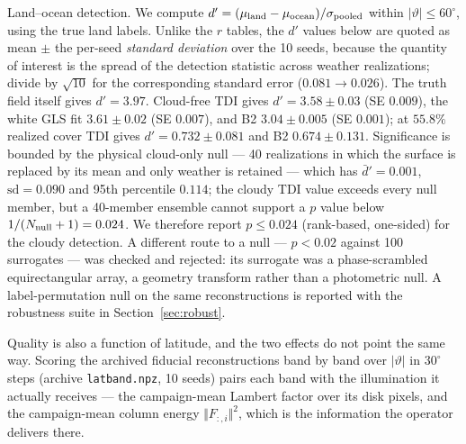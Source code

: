 \documentclass[twocolumn,10pt]{article}
\begin{document}
Land--ocean detection. We compute
$d'=(\mu_{\rm land}-\mu_{\rm ocean})/\sigma_{\rm pooled}$ within
$|\vartheta|\le60^\circ$, using the true land labels. Unlike the $r$
tables, the $d'$ values below are quoted as mean $\pm$ the per-seed
\emph{standard deviation} over the 10 seeds, because the quantity of interest is
the spread of the detection statistic across weather realizations; divide by
$\sqrt{10}$ for the corresponding standard error ($0.081\to0.026$). The truth
field itself
gives $d'=3.97$. Cloud-free TDI gives $d'=3.58\pm0.03$ (SE $0.009$), the white
GLS fit $3.61\pm0.02$ (SE $0.007$), and B2 $3.04\pm0.005$ (SE $0.001$); at
$55.8\%$ realized cover TDI gives
$d'=0.732\pm0.081$ and B2 $0.674\pm0.131$. Significance is bounded by the
physical cloud-only null --- 40 realizations in which the surface is replaced
by its mean and only weather is retained --- which has
$\bar{d}'=0.001$, $\mathrm{sd}=0.090$ and 95th percentile $0.114$; the cloudy
TDI value exceeds every null member, but a 40-member ensemble cannot
support a $p$ value below $1/(N_{\rm null}+1)=0.024$. We therefore report
$p\le0.024$ (rank-based, one-sided) for the cloudy detection. A different
route to a null --- $p<0.02$ against 100 surrogates --- was checked and
rejected: its surrogate was a phase-scrambled equirectangular array, a
geometry transform rather than a photometric null. A label-permutation null on the same reconstructions is
reported with the robustness suite in Section~\ref{sec:robust}.

Quality is also a function of latitude, and the two effects do not point
the same way. Scoring the archived fiducial reconstructions band by band over
$|\vartheta|$ in $30^{\circ}$ steps (archive {\tt latband.npz}, 10 seeds) pairs
each band with the illumination it actually receives --- the campaign-mean
Lambert factor over its disk pixels, and the campaign-mean column energy
$\Vert F_{:,i}\Vert^{2}$, which is the information the operator delivers there.
\end{document}
